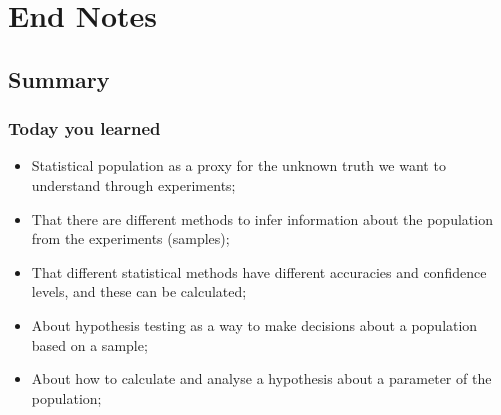 \documentclass[10pt]{beamer}
\begin{document}
\section{End Notes}

\subsection{Summary}
\begin{frame}
  \frametitle{Today you learned}
  \begin{itemize}
  \item Statistical population as a proxy for the unknown truth we
    want to understand through experiments;
  \item That there are different methods to infer information about
    the population from the experiments (samples);
  \item That different statistical methods have different accuracies
    and confidence levels, and these can be calculated;
  \item About hypothesis testing as a way to make decisions about a
    population based on a sample;
  \item About how to calculate and analyse a hypothesis about a
    parameter of the population;
  \end{itemize}
\end{frame}
\end{document}
